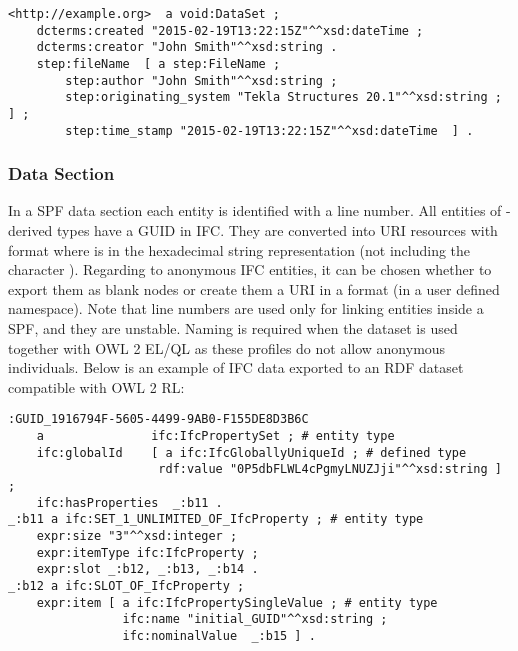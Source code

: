 \begin{lstlisting}
<http://example.org>  a void:DataSet ;
    dcterms:created "2015-02-19T13:22:15Z"^^xsd:dateTime ;
    dcterms:creator "John Smith"^^xsd:string .
    step:fileName  [ a step:FileName ;
        step:author "John Smith"^^xsd:string ;
        step:originating_system "Tekla Structures 20.1"^^xsd:string ; ] ;
        step:time_stamp "2015-02-19T13:22:15Z"^^xsd:dateTime  ] .
\end{lstlisting}


\subsubsection{Data Section} In a SPF data section each entity is identified with a line number.
All entities of -derived types have a GUID in IFC. They are converted into URI resources with format  where  is in the hexadecimal string representation (not including the character \name{\$}). Regarding to anonymous IFC entities, it can be chosen whether to export them as blank nodes or create them a URI in a format  (in a user defined namespace). Note that line numbers are used only for linking entities inside a SPF, and they are unstable. Naming is required when the dataset is used together with OWL 2 EL/QL as these profiles do not allow anonymous individuals. Below is an example of IFC data exported to an RDF dataset compatible with OWL 2 RL:

\begin{lstlisting}
:GUID_1916794F-5605-4499-9AB0-F155DE8D3B6C
    a               ifc:IfcPropertySet ; # entity type
    ifc:globalId    [ a ifc:IfcGloballyUniqueId ; # defined type
                     rdf:value "0P5dbFLWL4cPgmyLNUZJji"^^xsd:string ] ;
    ifc:hasProperties  _:b11 .
_:b11 a ifc:SET_1_UNLIMITED_OF_IfcProperty ; # entity type
    expr:size "3"^^xsd:integer ;
    expr:itemType ifc:IfcProperty ;
    expr:slot _:b12, _:b13, _:b14 .
_:b12 a ifc:SLOT_OF_IfcProperty ;
    expr:item [ a ifc:IfcPropertySingleValue ; # entity type
                ifc:name "initial_GUID"^^xsd:string ;
                ifc:nominalValue  _:b15 ] .
\end{lstlisting}



